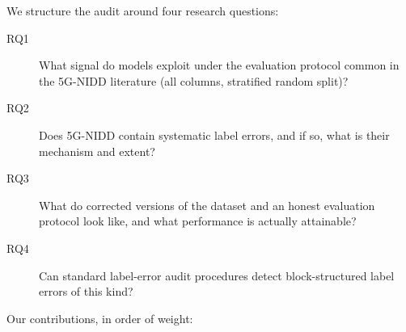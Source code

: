 \documentclass[preprint,12pt]{elsarticle}
\begin{document}
We structure the audit around four research questions:

\begin{description}
\item[RQ1] What signal do models exploit under the evaluation protocol common in
the 5G-NIDD literature (all columns, stratified random split)?
\item[RQ2] Does 5G-NIDD contain systematic label errors, and if so, what is
their mechanism and extent?
\item[RQ3] What do corrected versions of the dataset and an honest evaluation
protocol look like, and what performance is actually attainable?
\item[RQ4] Can standard label-error audit procedures detect block-structured
label errors of this kind?
\end{description}

Our contributions, in order of weight:
\end{document}
